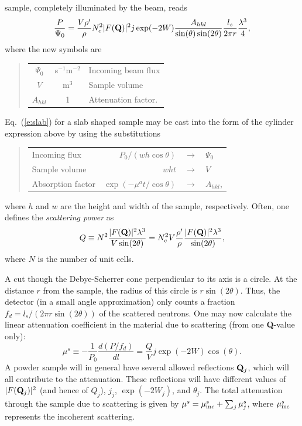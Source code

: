 sample, completely illuminated by the beam, reads \cite{bacon}
\begin{equation}
\frac{P}{\Psi_0} =
 \frac{V \rho'}{\rho} N_c^2 |F({\bf Q})|^2 j \exp(-2W)
                    \frac{A_{hkl}}{\sin(\theta)\sin(2\theta)}
                    \frac{l_s}{2\pi r} \frac{\lambda^3}{4} ,
\end{equation}
where the new symbols are
%
\begin{quote}\begin{tabular}{ccl}
$\Psi_0$  & s$^{-1}$m$^{-2}$ & Incoming beam flux \\
$V$       & m$^3$    & Sample volume \\
$A_{hkl}$ & 1        & Attenuation factor. \\
\end{tabular}\end{quote}
%
Eq.\ (\ref{e:slab}) for a slab shaped sample
may be cast into the form of the cylinder expression above
by using the substitutions
%
\begin{quote}\begin{tabular}{lrcl}
Incoming flux & $P_0 / (w h \cos\theta)$ & $\rightarrow$ & $\Psi_0$ \\
Sample volume & $w h t$ & $\rightarrow$ & $V$ \\
Absorption factor & $\exp(-\mu^a t / \cos\theta)$ & $\rightarrow$ & $A_{hkl}$, \\
\end{tabular}\end{quote}
%
where $h$ and $w$ are the height and width of the sample, respectively.
Often, one defines the {\em scattering power} as
\begin{equation}
Q \equiv N^2 \frac{|F({\bf Q})|^2 \lambda^3}{V \sin(2\theta)}
 = N_c^2 V \frac{\rho'}{\rho} \frac{|F({\bf Q})|^2 \lambda^3}{\sin(2\theta)} ,
\end{equation}
where $N$ is the number of unit cells.

A cut though the Debye-Scherrer cone perpendicular to its axis
is a circle. At the distance $r$ from the sample, the radius of this
circle is $r \sin(2\theta)$. Thus, the detector (in a small angle
approximation) only counts a fraction $f_d = l_s / (2 \pi r \sin(2 \theta))$
of the scattered neutrons.
One may now calculate the
linear attenuation coefficient in the material due to scattering
(from one {\bf Q}-value only):
\begin{equation}
\label{e:attenu}
\mu^s \equiv -\frac{1}{P_0} \frac{d(P/f_d)}{dl}
  = \frac{Q}{V} j \exp(-2W) \cos(\theta) .
\end{equation}
A powder sample will in general have several allowed reflections
${\bf Q}_j$, which will all contribute to the attenuation.
These reflections will have different values of
$|F({\bf Q}_j)|^2$ (and hence of $Q_j$), $j_j$, $\exp(-2W_j)$,
and $\theta_j$.
The total attenuation through the sample due to scattering is given by
$\mu^s = \mu_{\rm inc}^s + \sum_j \mu^s_j $,
where $\mu_{\rm inc}^s$ represents the incoherent scattering.

